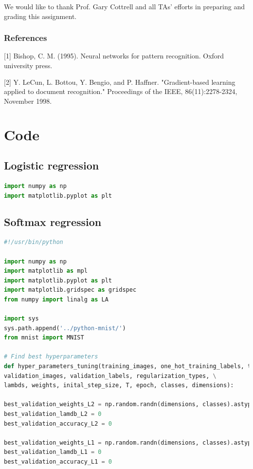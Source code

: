 \documentclass{article} %
\begin{document}
We would like to thank Prof. Gary Cottrell and all TAs' efforts in preparing and grading this assignment.

\subsubsection*{References}

\small{
[1] Bishop, C. M. (1995). Neural networks for pattern recognition. Oxford university press.

[2] Y. LeCun, L. Bottou, Y. Bengio, and P. Haffner. "Gradient-based learning applied to document recognition." Proceedings of the IEEE, 86(11):2278-2324, November 1998.

\section{Code}

\subsection{Logistic regression}
\begin{lstlisting}[language=Python]
%matplotlib inline
import numpy as np
import matplotlib.pyplot as plt
\end{lstlisting}

\subsection{Softmax regression}
\begin{lstlisting}[language=Python]
#!/usr/bin/python 

import numpy as np
import matplotlib as mpl
import matplotlib.pyplot as plt
import matplotlib.gridspec as gridspec
from numpy import linalg as LA

import sys
sys.path.append('../python-mnist/')
from mnist import MNIST

# Find best hyperparameters 
def hyper_parameters_tuning(training_images, one_hot_training_labels, test_images, test_labels, \
validation_images, validation_labels, regularization_types, \
lambds, weights, inital_step_size, T, epoch, classes, dimensions):

best_validation_weights_L2 = np.random.randn(dimensions, classes).astype(np.float32) 
best_validation_lamdb_L2 = 0
best_validation_accuracy_L2 = 0

best_validation_weights_L1 = np.random.randn(dimensions, classes).astype(np.float32) 
best_validation_lamdb_L1 = 0
best_validation_accuracy_L1 = 0


\end{lstlisting}}
\end{document}
